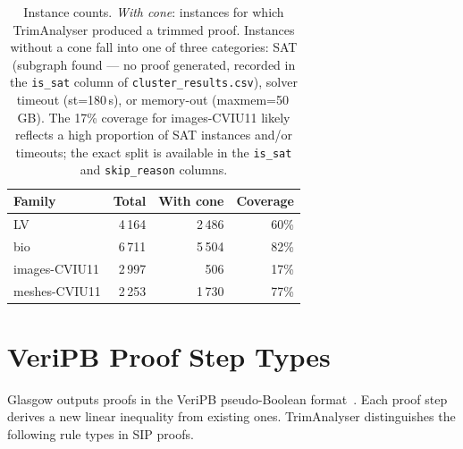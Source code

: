 \documentclass[11pt,a4paper]{article}
\begin{document}
\begin{table}[h]
\centering
\begin{tabular}{lrrr}
\toprule
Family & Total & With cone & Coverage \\
\midrule
LV            & 4\,164 & 2\,486 & 60\% \\
bio           & 6\,711 & 5\,504 & 82\% \\
images-CVIU11 & 2\,997 &   506  & 17\% \\
meshes-CVIU11 & 2\,253 & 1\,730 & 77\% \\
\bottomrule
\end{tabular}
\caption{Instance counts. \emph{With cone}: instances for which TrimAnalyser produced a trimmed proof.
Instances without a cone fall into one of three categories: SAT (subgraph found --- no proof generated,
recorded in the \texttt{is\_sat} column of \texttt{cluster\_results.csv}), solver timeout (st=180\,s),
or memory-out (maxmem=50\,GB).
The 17\% coverage for images-CVIU11 likely reflects a high proportion of SAT instances and/or
timeouts; the exact split is available in the \texttt{is\_sat} and \texttt{skip\_reason} columns.}
\label{tab:instance-counts}
\end{table}

\section{VeriPB Proof Step Types}
\label{sec:proof-steps}

Glasgow outputs proofs in the VeriPB pseudo-Boolean format~\cite{veripb-aaai2020}.
Each proof step derives a new linear inequality from existing ones.
TrimAnalyser distinguishes the following rule types in SIP proofs.
\end{document}
